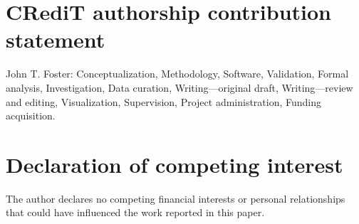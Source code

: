 \documentclass[11pt]{article}
\begin{document}
\section*{CRediT authorship contribution statement}

John T. Foster: Conceptualization, Methodology, Software, Validation, Formal
analysis, Investigation, Data curation, Writing---original draft,
Writing---review and editing, Visualization, Supervision, Project
administration, Funding acquisition.

\section*{Declaration of competing interest}

The author declares no competing financial interests or personal relationships
that could have influenced the work reported in this paper.




\end{document}
